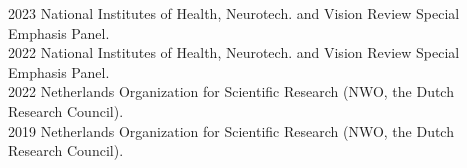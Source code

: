 2023 \hspace{58pt} National Institutes of Health, Neurotech. and Vision Review Special Emphasis Panel. \\
2022 \hspace{58pt} National Institutes of Health, Neurotech. and Vision Review Special Emphasis Panel. \\
2022 \hspace{58pt} Netherlands Organization for Scientific Research (NWO, the Dutch Research Council). \\
2019 \hspace{58pt} Netherlands Organization for Scientific Research (NWO, the Dutch Research Council). \\
